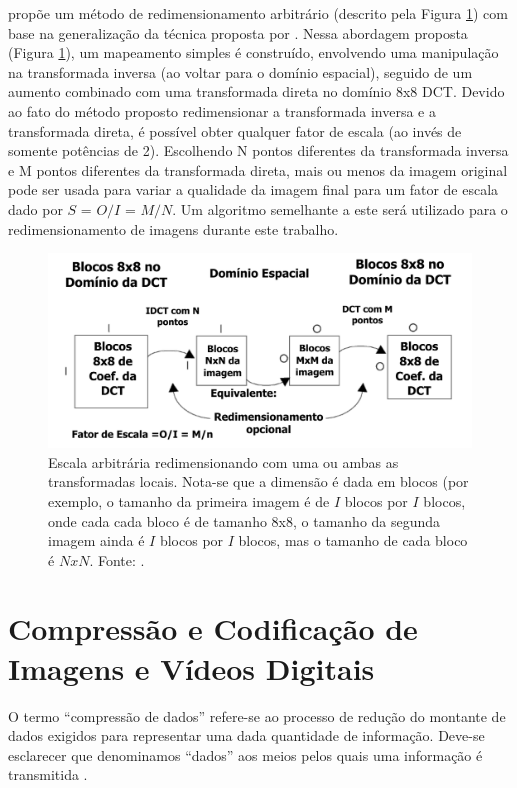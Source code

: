 \cite {salazar2007complexity} propõe um método de redimensionamento arbitrário (descrito pela Figura \ref{DCT_RES}) com base na generalização da técnica proposta por \cite{dugad2001fast}. Nessa abordagem proposta (Figura \ref{DCT_RES}), um mapeamento simples é construído, envolvendo uma manipulação na transformada inversa (ao voltar para o domínio espacial), seguido de um aumento combinado com uma transformada direta no domínio 8x8 DCT. Devido ao fato do método proposto redimensionar a transformada inversa e a transformada direta, é possível obter qualquer fator de escala (ao invés de somente potências de 2). Escolhendo N pontos diferentes da transformada inversa e M pontos diferentes da transformada direta, mais ou menos da imagem original pode ser usada para variar a qualidade da imagem final para um fator de escala dado por $S$ = $O/I$ = $M/N$.  Um algoritmo semelhante a este será utilizado para o redimensionamento de imagens durante este trabalho. 

\begin{figure}[h]
	\centering
	\includegraphics[scale=0.6]
{figuras/DCT_RES.pdf}
	\caption{Escala arbitrária redimensionando com uma ou ambas as transformadas locais. Nota-se que a dimensão é dada em blocos (por exemplo, o tamanho da primeira imagem é de $I$ blocos por $I$ blocos, onde cada cada bloco é de tamanho 8x8, o tamanho da segunda imagem ainda é $I$ blocos por $I$ blocos, mas o tamanho de cada bloco é $NxN$. Fonte: \cite{salazar2007complexity}.}
	\label{DCT_RES}
\end{figure}

\section{Compressão e Codificação de Imagens e Vídeos Digitais}

O termo \enquote{compressão de dados} refere-se ao processo de redução do montante de dados exigidos para representar uma dada quantidade de informação. Deve-se esclarecer que denominamos \enquote{dados} aos meios pelos quais uma informação é transmitida \cite{richardson2011h}.

